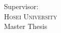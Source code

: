 \begin{titlepage}
\begin{center}
\vfill

Supervisor: \supname \\[0.5cm]
\textsc{Hosei University}\\
\number\year \; Master Thesis
 
\vfill
\end{center}

\end{titlepage}


